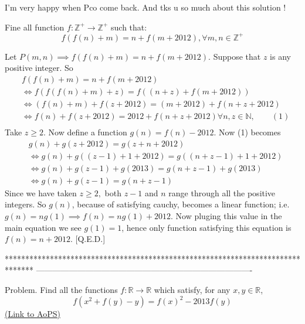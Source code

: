 \begin{solution}
	I'm very happy when Pco come back.
And tks u so much about this solution !
\end{solution}



\begin{solution}
	\begin{tcolorbox}Fine all function $f:\mathbb{Z}^{+} \to \mathbb{Z}^{+}$ such that: \[ f(f(n)+m)=n+f(m+2012), \forall m,n \in \mathbb{Z}^{+}\]\end{tcolorbox}
Let $P(m,n)\implies f(f(n)+m)=n+f(m+2012)$. Suppose that $z$ is any positive integer.
So 
\begin{align*}&f(f(n)+m)=n+f(m+2012)\\
&\Longleftrightarrow f(f(f(n)+m)+z)=f((n+z)+f(m+2012))\\
&\Longleftrightarrow (f(n)+m)+f(z+2012)=(m+2012)+f(n+z+2012)\\
&\Longleftrightarrow f(n)+f(z+2012)=2012+f(n+z+2012)\forall n,z\in \mathbb N,\quad \quad (1)\\
\end{align*}
Take $z\ge 2$.
Now define a function $g(n)=f(n)-2012$. Now (1) becomes
\begin{align*}&g(n)+g(z+2012)=g(z+n+2012)\\
&\Longleftrightarrow g(n)+g((z-1)+1+2012)=g((n+z-1)+1+2012)\\
&\Longleftrightarrow g(n)+g(z-1)+g(2013)=g(n+z-1)+g(2013)\\
&\Longleftrightarrow g(n)+g(z-1)=g(n+z-1)\end{align*}
Since we have taken $z\ge 2,$ both $z-1$ and $n$ range through all the positive integers. So $g(n)$, because of satisfying cauchy, becomes a linear function; i.e. $g(n)=ng(1)\implies f(n)=ng(1)+2012$. Now pluging this value in the main equation we see $g(1)=1$, hence only function satisfying this equation is $f(n)=n+2012$.
[Q.E.D.]
\end{solution}
*******************************************************************************
-------------------------------------------------------------------------------

\begin{problem}
	Problem. Find all the functions $f:\mathbb{R}\rightarrow \mathbb{R}$ which satisfy, for any $x,y\in \mathbb{R}$, \[f\left ( x^{2}+f(y)-y \right )=f(x)^{2}-2013f(y)\]
	\flushright \href{https://artofproblemsolving.com/community/c6h526796}{(Link to AoPS)}
\end{problem}



